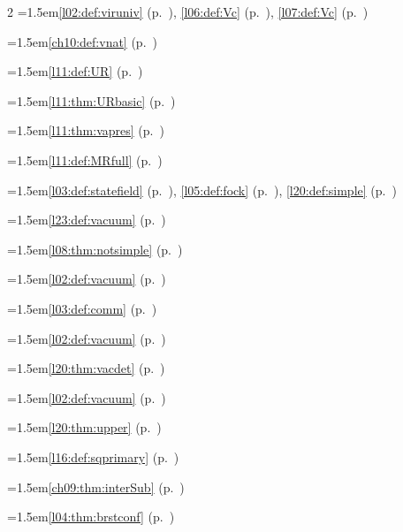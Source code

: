 \begin{multicols}{2}
\hangindent=1.5em\quad \ref{l02:def:viruniv} (p.~\pageref{l02:def:viruniv}), \ref{l06:def:Vc} (p.~\pageref{l06:def:Vc}), \ref{l07:def:Vc} (p.~\pageref{l07:def:Vc})\par
\hangindent=1.5em\quad \ref{ch10:def:vnat} (p.~\pageref{ch10:def:vnat})\par
\hangindent=1.5em\quad \ref{l11:def:UR} (p.~\pageref{l11:def:UR})\par
\hangindent=1.5em\quad \ref{l11:thm:URbasic} (p.~\pageref{l11:thm:URbasic})\par
\hangindent=1.5em\quad \ref{l11:thm:vapres} (p.~\pageref{l11:thm:vapres})\par
\hangindent=1.5em\quad \ref{l11:def:MRfull} (p.~\pageref{l11:def:MRfull})\par
\hangindent=1.5em\quad \ref{l03:def:statefield} (p.~\pageref{l03:def:statefield}), \ref{l05:def:fock} (p.~\pageref{l05:def:fock}), \ref{l20:def:simple} (p.~\pageref{l20:def:simple})\par
\hangindent=1.5em\quad \ref{l23:def:vacuum} (p.~\pageref{l23:def:vacuum})\par
\hangindent=1.5em\quad \ref{l08:thm:notsimple} (p.~\pageref{l08:thm:notsimple})\par
\hangindent=1.5em\quad \ref{l02:def:vacuum} (p.~\pageref{l02:def:vacuum})\par
\hangindent=1.5em\quad \ref{l03:def:comm} (p.~\pageref{l03:def:comm})\par
\hangindent=1.5em\quad \ref{l02:def:vacuum} (p.~\pageref{l02:def:vacuum})\par
\hangindent=1.5em\quad \ref{l20:thm:vacdet} (p.~\pageref{l20:thm:vacdet})\par
\hangindent=1.5em\quad \ref{l02:def:vacuum} (p.~\pageref{l02:def:vacuum})\par
\hangindent=1.5em\quad \ref{l20:thm:upper} (p.~\pageref{l20:thm:upper})\par
\hangindent=1.5em\quad \ref{l16:def:sqprimary} (p.~\pageref{l16:def:sqprimary})\par
\hangindent=1.5em\quad \ref{ch09:thm:interSub} (p.~\pageref{ch09:thm:interSub})\par
\hangindent=1.5em\quad \ref{l04:thm:brstconf} (p.~\pageref{l04:thm:brstconf})\par

\end{multicols}

